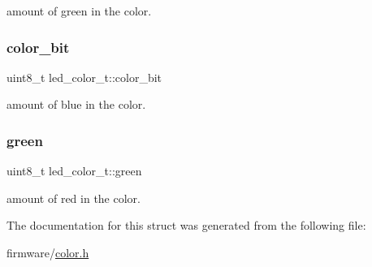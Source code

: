amount of green in the color. \hypertarget{structled__color__t_aec0d31c9fec35cc5ca2561f7458f2036}{}\label{structled__color__t_aec0d31c9fec35cc5ca2561f7458f2036} 
\subsubsection{\texorpdfstring{color\+\_\+bit}{color\_bit}}
{\footnotesize\ttfamily uint8\+\_\+t led\+\_\+color\+\_\+t\+::color\+\_\+bit}

amount of blue in the color. \hypertarget{structled__color__t_a6de2ea48f79a402a8ca9539aef558446}{}\label{structled__color__t_a6de2ea48f79a402a8ca9539aef558446} 
\subsubsection{\texorpdfstring{green}{green}}
{\footnotesize\ttfamily uint8\+\_\+t led\+\_\+color\+\_\+t\+::green}

amount of red in the color. 

The documentation for this struct was generated from the following file\+:\begin{DoxyCompactItemize}
\item 
firmware/\hyperlink{color_8h}{color.\+h}\end{DoxyCompactItemize}
